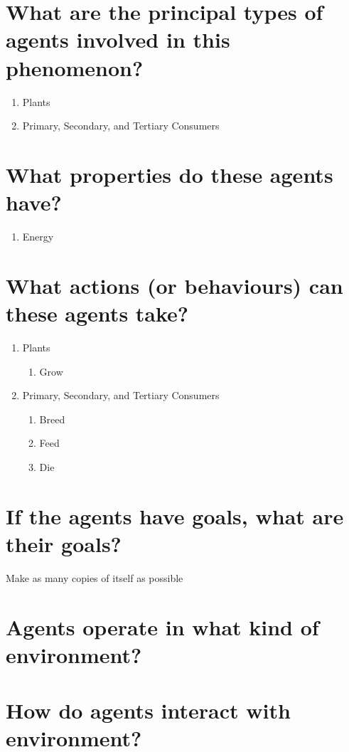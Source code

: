 \documentclass[]{article}
\begin{document}
\section{What are the principal types of agents involved in this phenomenon?}

\begin{enumerate}
	\item Plants
	\item Primary, Secondary, and Tertiary Consumers
\end{enumerate}

\section{What properties do these agents have?}

\begin{enumerate}
	\item Energy
\end{enumerate}

\section{What actions (or behaviours) can these agents take?}

\begin{enumerate}
	\item Plants
	\begin{enumerate}
		\item Grow
	\end{enumerate}	
	\item Primary, Secondary, and Tertiary Consumers
	\begin{enumerate}
		\item Breed
		\item Feed
		\item Die
	\end{enumerate}
\end{enumerate}


\section{If the agents have goals, what are their goals?}

Make as many copies of itself as possible

\section{Agents operate in what kind of environment?}
\section{How do agents interact with environment?}

\medskip



\end{document}
